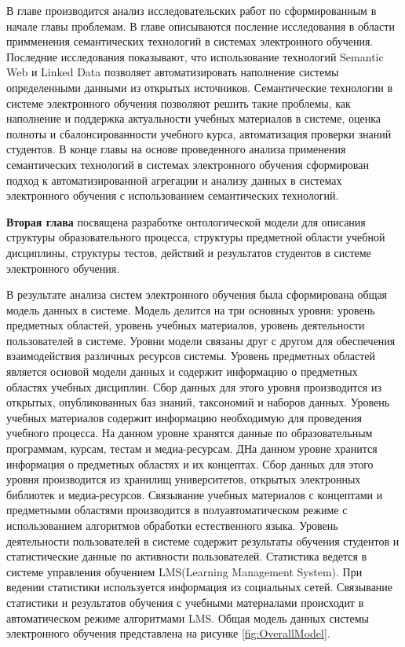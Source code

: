 В главе производится анализ исследовательских работ по сформированным в начале главы проблемам. В главе описываются посление исследования в области примменения семантических технологий в системах электронного обучения. Последние исследования показывают, что использование технологий Semantic Web и Linked Data позволяет автоматизировать наполнение системы определенными данными из открытых источников. Семантические технологии в системе электронного обучения позволяют решить такие проблемы, как наполнение и поддержка актуальности учебных материалов в системе, оценка полноты и сбалонсированности учебного курса, автоматизация проверки знаний студентов. 
В конце главы на основе проведенного анализа применения семантических технологий в системах электронного обучения сформирован подход к автоматизированной агрегации и анализу данных в системах электронного обучения с использованием семантических технологий. 

\textbf{Вторая глава} посвящена разработке онтологической модели для описания структуры образовательного процесса, структуры предметной области учебной дисциплины, структуры тестов, действий и результатов студентов в системе электронного обучения.

В результате анализа систем электронного обучения была сформирована общая модель данных в системе. Модель делится на три основных уровня: уровень предметных областей, уровень учебных материалов, уровень деятельности пользователей в системе. Уровни модели связаны друг с другом для обеспечения взаимодействия различных ресурсов системы. Уровень предметных областей является основой модели данных и содержит информацию о предметных областях учебных дисциплин. Сбор данных для этого уровня производится из открытых, опубликованных баз знаний, таксономий и наборов данных. Уровень учебных материалов содержит информацию необходимую для проведения учебного процесса. На данном уровне хранятся данные по образовательным программам, курсам, тестам и медиа-ресурсам. ДНа данном уровне хранится информация о предметных областях и их концептах. Сбор данных для этого уровня производится из хранилищ университетов, открытых электронных библиотек и медиа-ресурсов. Связывание учебных материалов с концептами и предметными областями производится в полуавтоматическом режиме с использованием алгоритмов обработки естественного языка. Уровень деятельности пользователей в системе содержит результаты обучения студентов и  статистические данные по активности пользователей. Статистика ведется в системе управления обучением LMS(Learning Management System). При ведении статистики используется информация из социальных сетей. Связывание статистики и результатов обучения с учебными материалами происходит в автоматическом режиме алгоритмами LMS. Общая модель данных системы электронного обучения представлена на рисунке \ref{fig:OverallModel}. 

